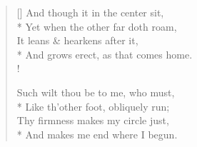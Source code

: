 \documentclass[MAIN]{subfiles}
\begin{document}
\begin{verse}[\versewidth]
And though it in the center sit,\\*
\vin Yet when the other far doth roam,\\
It leans \& hearkens after it,\\*
\vin And grows erect, as that comes home.\\!

Such wilt thou be to me, who must,\\*
\vin Like th'other foot, obliquely run;\\
Thy firmness makes my circle just,\\*
\vin And makes me end where I begun.
\end{verse}
\end{document}
